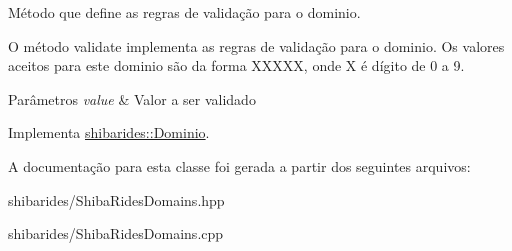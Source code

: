 Método que define as regras de validação para o dominio. 

O método validate implementa as regras de validação para o dominio. Os valores aceitos para este dominio são da forma X\+X\+X\+XX, onde X é dígito de 0 a 9.


\begin{DoxyParams}{Parâmetros}
{\em value} & Valor a ser validado \\
\hline
\end{DoxyParams}


Implementa \hyperlink{classshibarides_1_1Dominio_acc9445531455c072bbf708709aebbe55}{shibarides\+::\+Dominio}.



A documentação para esta classe foi gerada a partir dos seguintes arquivos\+:\begin{DoxyCompactItemize}
\item 
shibarides/Shiba\+Rides\+Domains.\+hpp\item 
shibarides/Shiba\+Rides\+Domains.\+cpp\end{DoxyCompactItemize}
